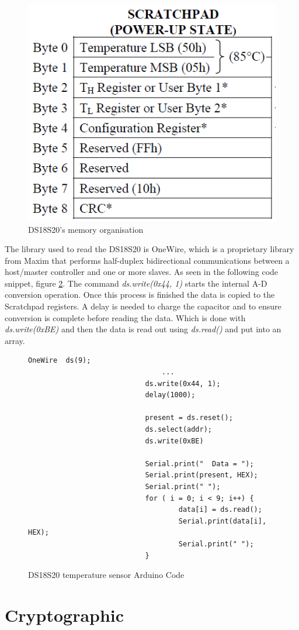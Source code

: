 \begin{figure}[H]
	\centering
	\includegraphics[width=.6\linewidth]{Figures/dsmem.png}
	\caption{DS18S20's memory organisation}
	\label{fig:dsmem}
\end{figure}

The library used to read the DS18S20 is OneWire, which is a proprietary library from Maxim that performs half-duplex bidirectional communications between a host/master controller and one or more slaves. As seen in the following code snippet, figure \ref{snip:tempcode}. The command \emph{ds.write(0x44, 1)} starts the internal A-D conversion operation. Once this process is finished the data is copied to the Scratchpad registers. A delay is needed to charge the capacitor and to ensure conversion is complete before reading the data. Which is done with \emph{ds.write(0xBE)} and then the data is read out using \emph{ds.read()} and put into an array.

\begin{figure}[H]
\begin{lstlisting}[style=Arduino]
  							OneWire  ds(9);
								...
  							ds.write(0x44, 1); 
  						 	delay(1000);

  							present = ds.reset();
  							ds.select(addr);    
 							ds.write(0xBE)

  							Serial.print("  Data = "); 
  							Serial.print(present, HEX);
 						 	Serial.print(" ");
  							for ( i = 0; i < 9; i++) {          
    								data[i] = ds.read();
    								Serial.print(data[i], HEX);
    								Serial.print(" ");
  							}

\end{lstlisting}
\caption{DS18S20 temperature sensor Arduino Code}
\label{snip:tempcode}
\end{figure}


\section{Cryptographic}


